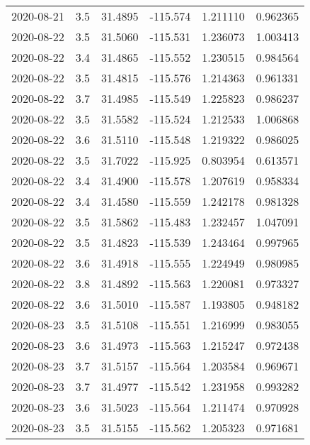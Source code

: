 \begin{tabular}{lrrrrr}
2020-08-21 &       3.5 &  31.4895 &  -115.574 &         1.211110 &         0.962365 \\
2020-08-22 &       3.5 &  31.5060 &  -115.531 &         1.236073 &         1.003413 \\
2020-08-22 &       3.4 &  31.4865 &  -115.552 &         1.230515 &         0.984564 \\
2020-08-22 &       3.5 &  31.4815 &  -115.576 &         1.214363 &         0.961331 \\
2020-08-22 &       3.7 &  31.4985 &  -115.549 &         1.225823 &         0.986237 \\
2020-08-22 &       3.5 &  31.5582 &  -115.524 &         1.212533 &         1.006868 \\
2020-08-22 &       3.6 &  31.5110 &  -115.548 &         1.219322 &         0.986025 \\
2020-08-22 &       3.5 &  31.7022 &  -115.925 &         0.803954 &         0.613571 \\
2020-08-22 &       3.4 &  31.4900 &  -115.578 &         1.207619 &         0.958334 \\
2020-08-22 &       3.4 &  31.4580 &  -115.559 &         1.242178 &         0.981328 \\
2020-08-22 &       3.5 &  31.5862 &  -115.483 &         1.232457 &         1.047091 \\
2020-08-22 &       3.5 &  31.4823 &  -115.539 &         1.243464 &         0.997965 \\
2020-08-22 &       3.6 &  31.4918 &  -115.555 &         1.224949 &         0.980985 \\
2020-08-22 &       3.8 &  31.4892 &  -115.563 &         1.220081 &         0.973327 \\
2020-08-22 &       3.6 &  31.5010 &  -115.587 &         1.193805 &         0.948182 \\
2020-08-23 &       3.5 &  31.5108 &  -115.551 &         1.216999 &         0.983055 \\
2020-08-23 &       3.6 &  31.4973 &  -115.563 &         1.215247 &         0.972438 \\
2020-08-23 &       3.7 &  31.5157 &  -115.564 &         1.203584 &         0.969671 \\
2020-08-23 &       3.7 &  31.4977 &  -115.542 &         1.231958 &         0.993282 \\
2020-08-23 &       3.6 &  31.5023 &  -115.564 &         1.211474 &         0.970928 \\
2020-08-23 &       3.5 &  31.5155 &  -115.562 &         1.205323 &         0.971681 \\

\end{tabular}
